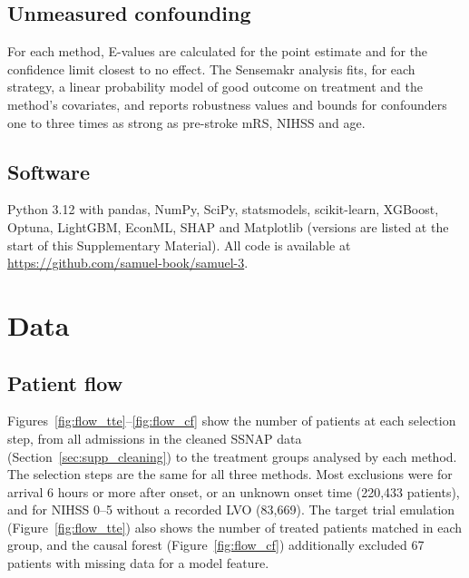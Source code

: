 \subsection{Unmeasured confounding}

For each method, E-values are calculated for the point estimate and for the confidence limit closest to no effect. The Sensemakr analysis fits, for each strategy, a linear probability model of good outcome on treatment and the method's covariates, and reports robustness values and bounds for confounders one to three times as strong as pre-stroke mRS, NIHSS and age.

\subsection{Software}

Python 3.12 with pandas, NumPy, SciPy, statsmodels, scikit-learn, XGBoost, Optuna, LightGBM, EconML, SHAP and Matplotlib (versions are listed at the start of this Supplementary Material). All code is available at \url{https://github.com/samuel-book/samuel-3}.


\newpage

\section{Data}

\subsection{Patient flow}\label{sec:supp_flow}

Figures~\ref{fig:flow_tte}--\ref{fig:flow_cf} show the number of patients at each selection step, from all admissions in the cleaned SSNAP data (Section~\ref{sec:supp_cleaning}) to the treatment groups analysed by each method. The selection steps are the same for all three methods. Most exclusions were for arrival 6 hours or more after onset, or an unknown onset time (220,433 patients), and for NIHSS 0--5 without a recorded LVO (83,669). The target trial emulation (Figure~\ref{fig:flow_tte}) also shows the number of treated patients matched in each group, and the causal forest (Figure~\ref{fig:flow_cf}) additionally excluded 67 patients with missing data for a model feature.

